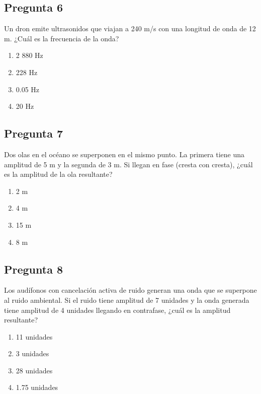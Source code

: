 \begin{preguntabox}
\section{Pregunta 6}
Un dron emite ultrasonidos que viajan a 240 m/s con una longitud de onda de 12 m. ¿Cuál es la frecuencia de la onda?

\begin{enumerate}
    \item[A)] 2 880 Hz
    \item[B)] 228 Hz
    \item[C)] 0.05 Hz
    \item[D)] 20 Hz
\end{enumerate}
\end{preguntabox}

\begin{preguntabox}
\section{Pregunta 7}
Dos olas en el océano se superponen en el mismo punto. La primera tiene una amplitud de 5 m y la segunda de 3 m. Si llegan en fase (cresta con cresta), ¿cuál es la amplitud de la ola resultante?

\begin{enumerate}
    \item[A)] 2 m
    \item[B)] 4 m
    \item[C)] 15 m
    \item[D)] 8 m
\end{enumerate}
\end{preguntabox}

\begin{preguntabox}
\section{Pregunta 8}
Los audífonos con cancelación activa de ruido generan una onda que se superpone al ruido ambiental. Si el ruido tiene amplitud de 7 unidades y la onda generada tiene amplitud de 4 unidades llegando en contrafase, ¿cuál es la amplitud resultante?

\begin{enumerate}
    \item[A)] 11 unidades
    \item[B)] 3 unidades
    \item[C)] 28 unidades
    \item[D)] 1.75 unidades
\end{enumerate}
\end{preguntabox}

